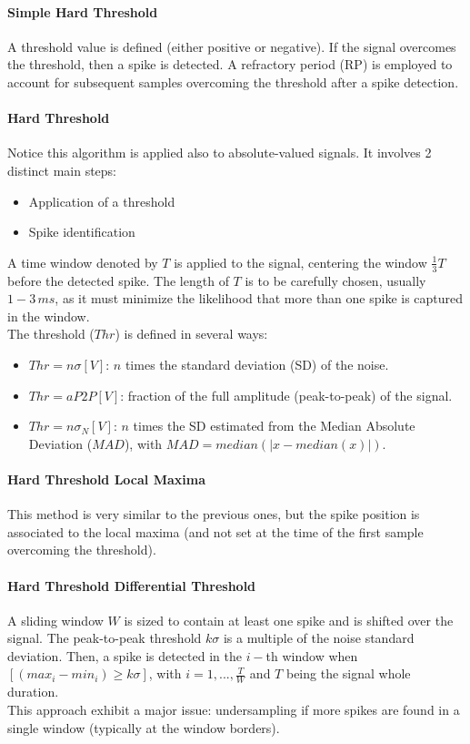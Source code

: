 \paragraph{Simple Hard Threshold}
A threshold value is defined (either positive or negative). If the signal
overcomes the threshold, then a spike is detected. A refractory period (RP)
is employed to account for subsequent samples overcoming the threshold after
a spike detection.
\paragraph{Hard Threshold} Notice this algorithm is applied also to
absolute-valued signals. It involves 2 distinct main steps:
\begin{itemize}
    \item Application of a threshold
    \item Spike identification
\end{itemize}
A time window denoted by \(T\) is applied to the signal, centering the window
\(\frac{1}{3}T\) before the detected spike. The length of \(T\) is to be
carefully chosen, usually \(1-3\,ms\), as it must minimize the likelihood that
more than one spike is captured in the window.\\
The threshold (\(Thr\)) is defined in several ways:
\begin{itemize}
    \item \(Thr=n\sigma[V]\): \(n\) times the standard deviation (SD) of
          the noise.
    \item \(Thr=aP2P[V]\): fraction of the full amplitude (peak-to-peak) of
          the signal.
    \item \(Thr=n\sigma_N[V]\): \(n\) times the SD estimated from the Median
          Absolute Deviation (\(MAD\)), with \(MAD=median(|x-median(x)|)\).
\end{itemize}
\paragraph{Hard Threshold Local Maxima}
This method is very similar to the previous ones, but the spike position is
associated to the local maxima (and not set at the time of the first sample
overcoming the threshold).
\paragraph{Hard Threshold Differential Threshold}
A sliding window \(W\) is sized to contain at least one spike and is shifted
over the signal. The peak-to-peak threshold \(k\sigma\) is a multiple of the
noise standard deviation. Then, a spike is detected in the \(i-\)th window
when \([(max_i-min_i)\ge{k\sigma}]\), with \(i=1,...,\frac{T}{W}\) and \(T\)
being the signal whole duration.\\
This approach exhibit a major issue: undersampling if more spikes are found in
a single window (typically at the window borders).
